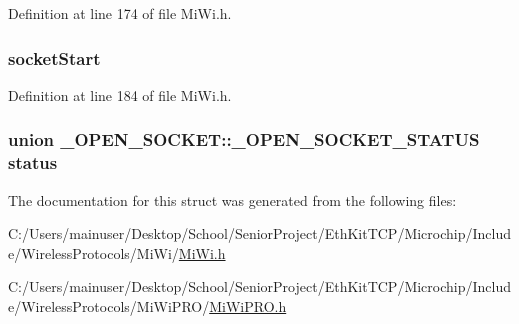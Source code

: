 Definition at line 174 of file Mi\+Wi.\+h.

\hypertarget{struct___o_p_e_n___s_o_c_k_e_t_a70db9c66af172a2bc0d47a4bec086049}{}
\subsubsection[{socket\+Start}]{ socket\+Start}\label{struct___o_p_e_n___s_o_c_k_e_t_a70db9c66af172a2bc0d47a4bec086049}


Definition at line 184 of file Mi\+Wi.\+h.

\hypertarget{struct___o_p_e_n___s_o_c_k_e_t_a7d0a0f277b2cbee445cb7c84b77fb304}{}
\subsubsection[{status}]{\setlength{\rightskip}{0pt plus 5cm}union {\bf \+\_\+\+O\+P\+E\+N\+\_\+\+S\+O\+C\+K\+E\+T\+::\+\_\+\+O\+P\+E\+N\+\_\+\+S\+O\+C\+K\+E\+T\+\_\+\+S\+T\+A\+T\+U\+S} status}\label{struct___o_p_e_n___s_o_c_k_e_t_a7d0a0f277b2cbee445cb7c84b77fb304}


The documentation for this struct was generated from the following files\+:\begin{DoxyCompactItemize}
\item 
C\+:/\+Users/mainuser/\+Desktop/\+School/\+Senior\+Project/\+Eth\+Kit\+T\+C\+P/\+Microchip/\+Include/\+Wireless\+Protocols/\+Mi\+Wi/\hyperlink{_mi_wi_8h}{Mi\+Wi.\+h}\item 
C\+:/\+Users/mainuser/\+Desktop/\+School/\+Senior\+Project/\+Eth\+Kit\+T\+C\+P/\+Microchip/\+Include/\+Wireless\+Protocols/\+Mi\+Wi\+P\+R\+O/\hyperlink{_mi_wi_p_r_o_8h}{Mi\+Wi\+P\+R\+O.\+h}\end{DoxyCompactItemize}
